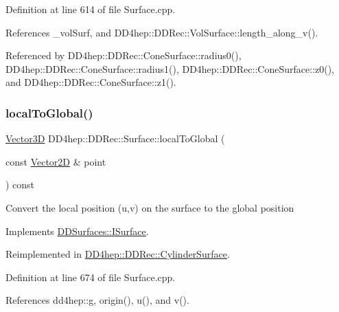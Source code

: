 Definition at line 614 of file Surface.\+cpp.



References \+\_\+vol\+Surf, and D\+D4hep\+::\+D\+D\+Rec\+::\+Vol\+Surface\+::length\+\_\+along\+\_\+v().



Referenced by D\+D4hep\+::\+D\+D\+Rec\+::\+Cone\+Surface\+::radius0(), D\+D4hep\+::\+D\+D\+Rec\+::\+Cone\+Surface\+::radius1(), D\+D4hep\+::\+D\+D\+Rec\+::\+Cone\+Surface\+::z0(), and D\+D4hep\+::\+D\+D\+Rec\+::\+Cone\+Surface\+::z1().

\hypertarget{class_d_d4hep_1_1_d_d_rec_1_1_surface_a766587a97ca4b6c7ef4d2f72b967379c}{}\label{class_d_d4hep_1_1_d_d_rec_1_1_surface_a766587a97ca4b6c7ef4d2f72b967379c} 
\subsubsection{\texorpdfstring{local\+To\+Global()}{localToGlobal()}}
{\footnotesize\ttfamily \hyperlink{class_d_d_surfaces_1_1_vector3_d}{Vector3D} D\+D4hep\+::\+D\+D\+Rec\+::\+Surface\+::local\+To\+Global (\begin{DoxyParamCaption}\item[{const \hyperlink{class_d_d_surfaces_1_1_vector2_d}{Vector2D} \&}]{point }\end{DoxyParamCaption}) const\hspace{0.3cm}{\ttfamily [virtual]}}

Convert the local position (u,v) on the surface to the global position 

Implements \hyperlink{class_d_d_surfaces_1_1_i_surface_a39651d79f7969ac7402a6e2cfc37803c}{D\+D\+Surfaces\+::\+I\+Surface}.



Reimplemented in \hyperlink{class_d_d4hep_1_1_d_d_rec_1_1_cylinder_surface_a865ff9150e26d017de4357af5ea77d6b}{D\+D4hep\+::\+D\+D\+Rec\+::\+Cylinder\+Surface}.



Definition at line 674 of file Surface.\+cpp.



References dd4hep\+::g, origin(), u(), and v().

\hypertarget{class_d_d4hep_1_1_d_d_rec_1_1_surface_a39933172300e705018ff3b3a0de450a3}{}\label{class_d_d4hep_1_1_d_d_rec_1_1_surface_a39933172300e705018ff3b3a0de450a3} 
